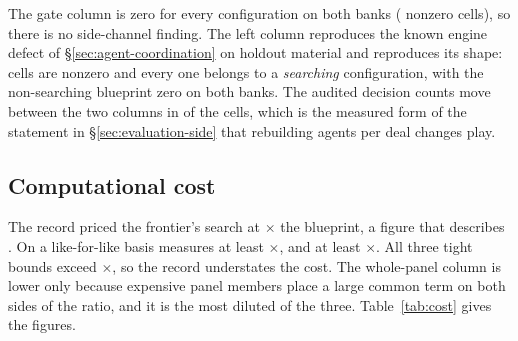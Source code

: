 \begin{table}[!ht]\centering
\caption{The seat-isolation residual on holdout material, \vsevenSsixCells{} cells over
\vsevenSsixDeals{} audited deals. The right column is the registered zero-tolerance condition; the
left column is the deployed mode.}
\label{tab:residual}
{\tabfont}
\end{table}

The gate column is zero for every configuration on both banks
(\vsevenSsixGateNonzero{} nonzero cells), so there is no side-channel finding. The left column
reproduces the known engine defect of \S\ref{sec:agent-coordination} on holdout material and
reproduces its shape: \vsevenSsixPlainNonzero{} cells are nonzero and every one belongs to a
\emph{searching} configuration, with the non-searching blueprint zero on both banks. The audited
decision counts move between the two columns in \vsevenSsixDenomMoved{} of the cells, which is the
measured form of the statement in \S\ref{sec:evaluation-side} that rebuilding agents per deal changes
play.

\subsection{Computational cost}
\label{sec:results-cost}

The record priced the frontier's search at \vsevenCostRecorded$\times$ the blueprint, a figure that
describes \fcheap{}. On a like-for-like basis \fcheap{} measures at least
\vsevenCostFcheapTight$\times$, and \sestina{} at least \vsevenCostFrozenTight$\times$. All three
tight bounds exceed \vsevenCostRecorded$\times$, so the record understates the cost. The whole-panel
column is lower only because expensive panel members place a large common term on both sides of the
ratio, and it is the most diluted of the three. Table~\ref{tab:cost} gives the figures.

\begin{table}[!ht]\centering
\caption{Cost relative to the blueprint. Every figure is a \emph{lower bound}, because the harness
reports whole-match throughput, which carries the opponent's cost on both sides of the ratio. The
bound is tightest against the cheapest opponent. No figure carries an interval, these being wall-clock
timings taken across a battery that ran over two days, and the aggregation is a ratio of medians,
which differs from a median of per-bank ratios by at most \vsevenCostAggDelta{} across the six median
cells.}
\label{tab:cost}
{\tabfont}
\end{table}

